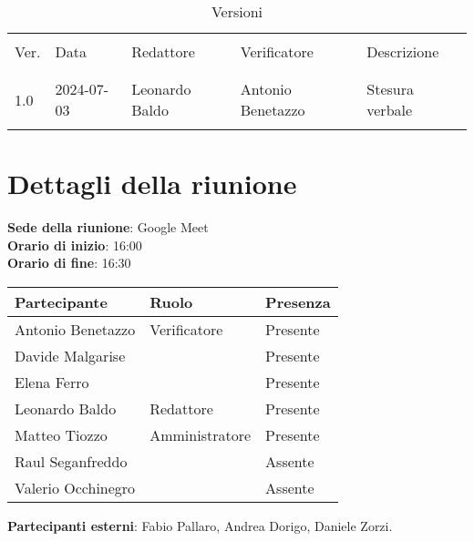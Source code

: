 \documentclass[italian,12pt]{article}
\begin{document}


\newpage



\begin{table}[!h]
	\caption{Versioni}
	\footnotesize
	\begin{center}
		\begin{tabular}{ l l l l p{6cm} }
			\hline                                                                     \\[-2ex]
			Ver. & Data       & Redattore        & Verificatore      & Descrizione     \\
			\\[-2ex] \hline \\[-1.5ex]
			1.0  & 2024-07-03 & Leonardo Baldo   & Antonio Benetazzo & Stesura verbale \\
			\\[-1.5ex] \hline
		\end{tabular}
	\end{center}
\end{table}

\newpage

\tableofcontents

\newpage

\section{Dettagli della riunione}

\textbf{Sede della riunione}: Google Meet\\
\textbf{Orario di inizio}: 16:00\\
\textbf{Orario di fine}: 16:30\\

\begin{flushleft}
	\begin{table}[!h]
		\begin{tabular}{ |l|l|l| }
			\hline
			\textbf{Partecipante} & \textbf{Ruolo} & \textbf{Presenza} \\
			\hline
			Antonio Benetazzo     & Verificatore   & Presente          \\
			Davide Malgarise      &                & Presente          \\
			Elena Ferro           &                & Presente          \\
			Leonardo Baldo        & Redattore      & Presente          \\
			Matteo Tiozzo         & Amministratore & Presente          \\
			Raul Seganfreddo      &                & Assente           \\
			Valerio Occhinegro    &                & Assente           \\
			\hline
		\end{tabular}
	\end{table}
	\textbf{Partecipanti esterni}: Fabio Pallaro, Andrea Dorigo, Daniele Zorzi.\\
\end{flushleft}
\end{document}
